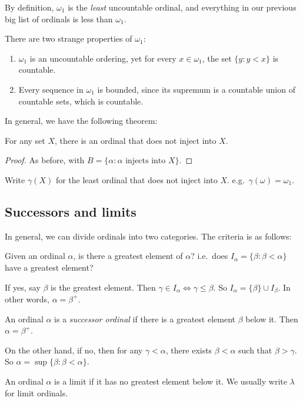\documentclass[a4paper]{article}
\begin{document}
By definition, $\omega_1$ is the \emph{least} uncountable ordinal, and everything in our previous big list of ordinals is less than $\omega_1$.

There are two strange properties of $\omega_1$:
\begin{enumerate}
  \item $\omega_1$ is an uncountable ordering, yet for every $x\in \omega_1$, the set $\{y: y< x\}$ is countable.
  \item Every sequence in $\omega_1$ is bounded, since its supremum is a countable union of countable sets, which is countable.
\end{enumerate}

In general, we have the following theorem:
\begin{thm}
  For any set $X$, there is an ordinal that does not inject into $X$.
\end{thm}

\begin{proof}
  As before, with $B = \{\alpha: \alpha\text{ injects into }X\}$.
\end{proof}

\begin{notation}
  Write $\gamma(X)$ for the least ordinal that does not inject into $X$. e.g.\ $\gamma(\omega) = \omega_1$.
\end{notation}

\subsection{Successors and limits}
In general, we can divide ordinals into two categories. The criteria is as follows:

Given an ordinal $\alpha$, is there a greatest element of $\alpha$? i.e.\ does $I_\alpha = \{\beta: \beta < \alpha\}$ have a greatest element?

If yes, say $\beta$ is the greatest element. Then $\gamma\in I_\alpha \Leftrightarrow \gamma \leq \beta$. So $I_\alpha = \{\beta\}\cup I_\beta$. In other words, $\alpha = \beta^+$.

\begin{defi}
  An ordinal $\alpha$ is a \emph{successor ordinal} if there is a greatest element $\beta$ below it. Then $\alpha = \beta^+$.
\end{defi}

On the other hand, if no, then for any $\gamma < \alpha$, there exists $\beta < \alpha$ such that $\beta > \gamma$. So $\alpha = \sup \{\beta: \beta < \alpha\}$.
\begin{defi}
  An ordinal $\alpha$ is a limit if it has no greatest element below it. We usually write $\lambda$ for limit ordinals.
\end{defi}
\end{document}
